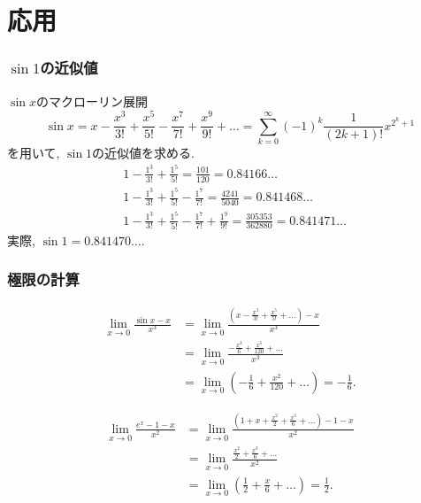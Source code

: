 
\section{応用}

\begin{frame}
\frametitle{$\sin 1$の近似値}

$\sin x$のマクローリン展開 
\begin{equation}
\sin x = x-\frac{x^3}{3!}+\frac{x^5}{5!}-\frac{x^7}{7!}+\frac{x^9}{9!}+\dots = \sum_{k=0}^{\infty} (-1)^{k} \frac{1}{(2k+1)!}x^{2^k+1} \nonumber
\end{equation}
を用いて, $\sin 1$の近似値を求める. 
\begin{align*}
& 1-\frac{1^3}{3!}+\frac{1^5}{5!} = \frac{101}{120}=0.84166\dots \\
& 1-\frac{1^3}{3!}+\frac{1^5}{5!}-\frac{1^7}{7!} = \frac{4241}{5040}=0.841468\dots \\
& 1-\frac{1^3}{3!}+\frac{1^5}{5!}-\frac{1^7}{7!}+\frac{1^9}{9!} = \frac{305353}{362880}=0.841471\dots
\end{align*}
実際, $\sin 1 = 0.841470\dots$. 
\end{frame}








\begin{frame}
\frametitle{極限の計算}

\vspace{-5mm}

\begin{align*}
\lim_{x \to 0} \frac{\sin x -x}{x^3} & = \lim_{x \to 0} \frac{(x -\frac{x^3}{3!}+\frac{x^5}{5!}+\dots) -x}{x^3} \\
& =   \lim_{x \to 0} \frac{-\frac{x^3}{6}+\frac{x^5}{120}+\dots}{x^3} \\
& =   \lim_{x \to 0} (-\frac{1}{6}+\frac{x^2}{120}+\dots ) = -\frac{1}{6}. 
\end{align*}

\begin{align*}
\lim_{x \to 0} \frac{e^x-1-x}{x^2} &=  \lim_{x \to 0} \frac{(1+x+\frac{x^2}{2}+\frac{x^3}{6}+\dots )-1-x}{x^2} \\
& = \lim_{x \to 0} \frac{\frac{x^2}{2}+\frac{x^3}{6}+\dots}{x^2} \\
& = \lim_{x \to 0} (\frac{1}{2}+\frac{x}{6}+\dots)= \frac{1}{2}.  
\end{align*}

\end{frame}




